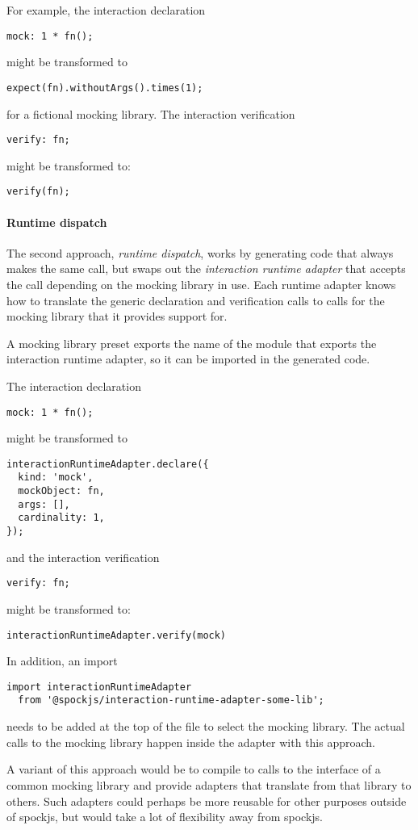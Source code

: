 For example, the interaction declaration
\begin{verbatim}
mock: 1 * fn();
\end{verbatim}
might be transformed to
\begin{verbatim}
expect(fn).withoutArgs().times(1);
\end{verbatim}
for a fictional mocking library.
The interaction verification
\begin{verbatim}
verify: fn;
\end{verbatim}
might be transformed to:
\begin{verbatim}
verify(fn);
\end{verbatim}

\paragraph{Runtime dispatch}
The second approach, \textit{runtime dispatch},
works by generating code that always makes the same call,
but swaps out the \textit{interaction runtime adapter} that accepts the call
depending on the mocking library in use.
Each runtime adapter knows how to translate the generic
declaration and verification calls to calls for the mocking library
that it provides support for.

A mocking library preset exports the name of the module
that exports the interaction runtime adapter,
so it can be imported in the generated code.

The interaction declaration
\begin{verbatim}
mock: 1 * fn();
\end{verbatim}
might be transformed to
\begin{verbatim}
interactionRuntimeAdapter.declare({
  kind: 'mock',
  mockObject: fn,
  args: [],
  cardinality: 1,
});
\end{verbatim}
and the interaction verification
\begin{verbatim}
verify: fn;
\end{verbatim}
might be transformed to:
\begin{verbatim}
interactionRuntimeAdapter.verify(mock)
\end{verbatim}
In addition, an import
\begin{verbatim}
import interactionRuntimeAdapter
  from '@spockjs/interaction-runtime-adapter-some-lib';
\end{verbatim}
needs to be added at the top of the file
to select the mocking library.
The actual calls to the mocking library
happen inside the adapter with this approach.

A variant of this approach would be to compile to calls
to the interface of a common mocking library
and provide adapters that translate from that library to others.
Such adapters could perhaps be more reusable
for other purposes outside of spockjs,
but would take a lot of flexibility away from spockjs.
